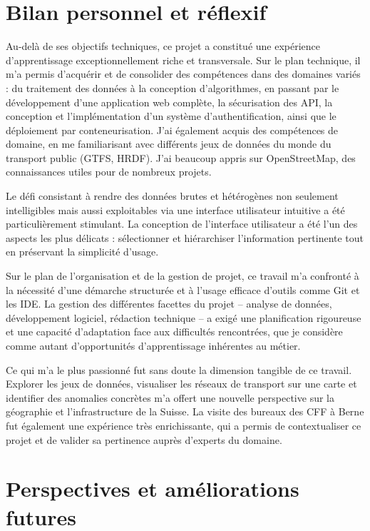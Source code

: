 \section*{Bilan personnel et réflexif}

Au-delà de ses objectifs techniques, ce projet a constitué une expérience d'apprentissage exceptionnellement riche et transversale. Sur le plan technique, il m'a permis d'acquérir et de consolider des compétences dans des domaines variés : du traitement des données à la conception d'algorithmes, en passant par le développement d'une application web complète, la sécurisation des API, la conception et l’implémentation d’un système d’authentification, ainsi que le déploiement par conteneurisation.
J’ai également acquis des compétences de domaine, en me familiarisant avec différents jeux de données du monde du transport public (GTFS, HRDF). J’ai beaucoup appris sur OpenStreetMap, des connaissances utiles pour de nombreux projets.

Le défi consistant à rendre des données brutes et hétérogènes non seulement intelligibles mais aussi exploitables via une interface utilisateur intuitive a été particulièrement stimulant.
La conception de l’interface utilisateur a été l’un des aspects les plus délicats : sélectionner et hiérarchiser l’information pertinente tout en préservant la simplicité d’usage.

Sur le plan de l'organisation et de la gestion de projet, ce travail m'a confronté à la nécessité d'une démarche structurée et à l'usage efficace d'outils comme Git et les IDE. La gestion des différentes facettes du projet – analyse de données, développement logiciel, rédaction technique – a exigé une planification rigoureuse et une capacité d'adaptation face aux difficultés rencontrées, que je considère comme autant d'opportunités d'apprentissage inhérentes au métier.

Ce qui m'a le plus passionné fut sans doute la dimension tangible de ce travail. Explorer les jeux de données, visualiser les réseaux de transport sur une carte et identifier des anomalies concrètes m'a offert une nouvelle perspective sur la géographie et l'infrastructure de la Suisse. La visite des bureaux des CFF à Berne fut également une expérience très enrichissante, qui a permis de contextualiser ce projet et de valider sa pertinence auprès d'experts du domaine.

\section*{Perspectives et améliorations futures}

